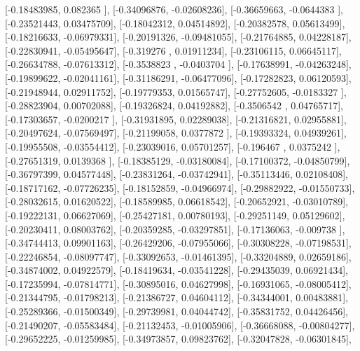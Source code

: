\documentclass{article}
\begin{document}
       [-0.18483985,  0.082365  ],
       [-0.34096876, -0.02608236],
       [-0.36659663, -0.0644383 ],
       [-0.23521443,  0.03475709],
       [-0.18042312,  0.04514892],
       [-0.20382578,  0.05613499],
       [-0.18216633, -0.06979331],
       [-0.20191326, -0.09481055],
       [-0.21764885,  0.04228187],
       [-0.22830941, -0.05495647],
       [-0.319276  ,  0.01911234],
       [-0.23106115,  0.06645117],
       [-0.26634788, -0.07613312],
       [-0.3538823 , -0.0403704 ],
       [-0.17638991, -0.04263248],
       [-0.19899622, -0.02041161],
       [-0.31186291, -0.06477096],
       [-0.17282823,  0.06120593],
       [-0.21948944,  0.02911752],
       [-0.19779353,  0.01565747],
       [-0.27752605, -0.0183327 ],
       [-0.28823904,  0.00702088],
       [-0.19326824,  0.04192882],
       [-0.3506542 ,  0.04765717],
       [-0.17303657, -0.0200217 ],
       [-0.31931895,  0.02289038],
       [-0.21316821,  0.02955881],
       [-0.20497624, -0.07569497],
       [-0.21199058,  0.0377872 ],
       [-0.19393324,  0.04939261],
       [-0.19955508, -0.03554412],
       [-0.23039016,  0.05701257],
       [-0.196467  ,  0.0375242 ],
       [-0.27651319,  0.0139368 ],
       [-0.18385129, -0.03180084],
       [-0.17100372, -0.04850799],
       [-0.36797399,  0.04577448],
       [-0.23831264, -0.03742941],
       [-0.35113446,  0.02108408],
       [-0.18717162, -0.07726235],
       [-0.18152859, -0.04966974],
       [-0.29882922, -0.01550733],
       [-0.28032615,  0.01620522],
       [-0.18589985,  0.06618542],
       [-0.20652921, -0.03010789],
       [-0.19222131,  0.06627069],
       [-0.25427181,  0.00780193],
       [-0.29251149,  0.05129602],
       [-0.20230411,  0.08003762],
       [-0.20359285, -0.03297851],
       [-0.17136063, -0.009738  ],
       [-0.34744413,  0.09901163],
       [-0.26429206, -0.07955066],
       [-0.30308228, -0.07198531],
       [-0.22246854, -0.08097747],
       [-0.33092653, -0.01461395],
       [-0.33204889,  0.02659186],
       [-0.34874002,  0.04922579],
       [-0.18419634, -0.03541228],
       [-0.29435039,  0.06921434],
       [-0.17235994, -0.07814771],
       [-0.30895016,  0.04627998],
       [-0.16931065, -0.08005412],
       [-0.21344795, -0.01798213],
       [-0.21386727,  0.04604112],
       [-0.34344001,  0.00483881],
       [-0.25289366, -0.01500349],
       [-0.29739981,  0.04044742],
       [-0.35831752,  0.04426456],
       [-0.21490207, -0.05583484],
       [-0.21132453, -0.01005906],
       [-0.36668088, -0.00804277],
       [-0.29652225, -0.01259985],
       [-0.34973857,  0.09823762],
       [-0.32047828, -0.06301845],
\end{document}
